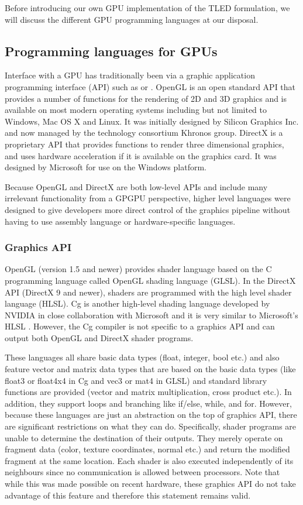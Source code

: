 Before introducing our own GPU implementation of the TLED formulation, we will discuss the different GPU programming languages at our disposal. 


	\subsection{Programming languages for GPUs}

Interface with a GPU has traditionally been via a graphic application programming interface (API) such as  or \citeauthor{DirectX}. OpenGL is an open standard API that provides a number of functions for the rendering of 2D and 3D graphics and is available on most modern operating systems including but not limited to Windows, Mac OS X and Linux. It was initially designed by Silicon Graphics Inc. and now managed by the technology consortium Khronos group. DirectX is a proprietary API that provides functions to render three dimensional graphics, and uses hardware acceleration if it is available on the graphics card. It was designed by Microsoft for use on the Windows platform. 

Because OpenGL and DirectX are both low-level APIs and include many irrelevant functionality from a GPGPU perspective, higher level languages were designed to give developers more direct control of the graphics pipeline without having to use assembly language or hardware-specific languages. 
	
		\subsubsection*{Graphics API}
OpenGL (version 1.5 and newer) provides shader language based on the C programming language called OpenGL shading language (GLSL). In the DirectX API (DirectX 9 and newer), shaders are programmed with the high level shader language (HLSL). Cg is another high-level shading language developed by NVIDIA in close collaboration with Microsoft and it is very similar to Microsoft's HLSL \citep{Mark03}. However, the Cg compiler is not specific to a graphics API and can output both OpenGL and DirectX shader programs. 

These languages all share basic data types (float, integer, bool etc.) and also feature vector and matrix data types that are based on the basic data types (like float3 or float4x4 in Cg and vec3 or mat4 in GLSL) and standard library functions are provided (vector and matrix multiplication, cross product etc.). In addition, they support loops and branching like if/else, while, and for. However, because these languages are just an abstraction on the top of graphics API, there are significant restrictions on what they can do. Specifically, shader programs are unable to determine the destination of their outputs. They merely operate on fragment data (color, texture coordinates, normal etc.) and return the modified fragment at the same location. Each shader is also executed independently of its neighbours since no communication is allowed between processors. Note that while this was made possible on recent hardware, these graphics API do not take advantage of this feature and therefore this statement remains valid. 

